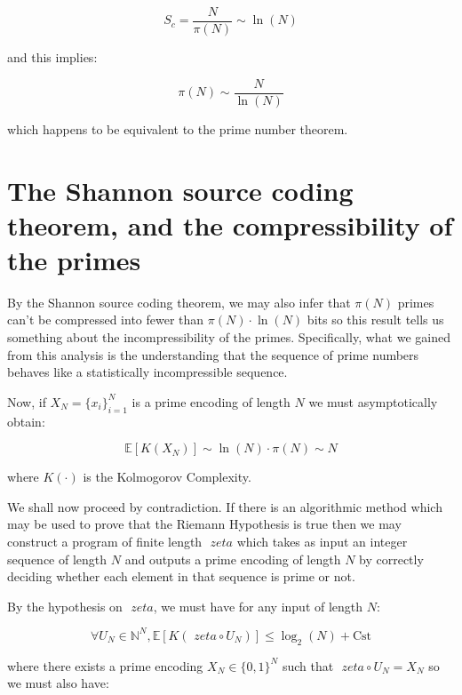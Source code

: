 \documentclass{article}
\begin{document}
\begin{equation}
S_c = \frac{N}{\pi(N)} \sim \ln(N) 
\end{equation}

and this implies: 

\begin{equation}
\pi(N) \sim \frac{N}{\ln(N)}
\end{equation}

which happens to be equivalent to the prime number theorem. 

\newpage 

\section{The Shannon source coding theorem, and the compressibility of the primes}

By the Shannon source coding theorem, we may also infer that $\pi(N)$ primes can't be compressed into fewer than $\pi(N) \cdot \ln(N)$ bits so this result tells us something about the incompressibility of the primes. Specifically, what we gained from this analysis is the understanding that the sequence of prime numbers behaves like a statistically incompressible sequence. 

Now, if $X_N = \{x_i\}_{i=1}^N$ is a prime encoding of length $N$ we must asymptotically obtain: 

\begin{equation}
\mathbb{E}[K(X_N)] \sim \ln(N) \cdot \pi(N) \sim N
\end{equation}

where $K(\cdot)$ is the Kolmogorov Complexity. 

We shall now proceed by contradiction. If there is an algorithmic method which may be used to prove that the Riemann Hypothesis is true then we may construct a program of finite length $\textit{ zeta}$ which takes as input an integer sequence of length $N$ and outputs a prime encoding of length $N$ by correctly deciding whether each element in that sequence is prime or not. 

By the hypothesis on $\textit{ zeta}$, we must have for any input of length $N$: 

\begin{equation}
\forall U_N \in \mathbb{N}^N, \mathbb{E}[K(\textit{ zeta} \circ U_N)] \leq \log_2(N) + \text{Cst} 	
\end{equation}

where there exists a prime encoding $X_N \in \{0,1\}^N$ such that $\textit{ zeta} \circ U_N = X_N$ so we must also have: 
\end{document}

